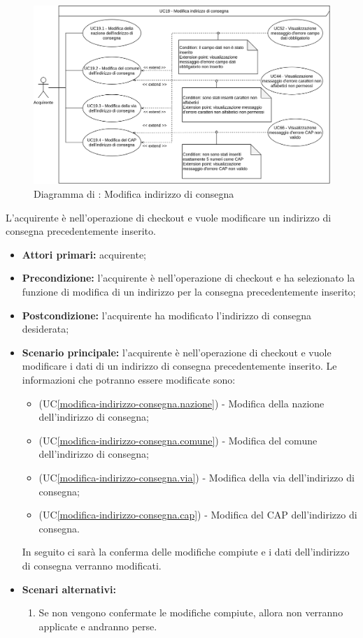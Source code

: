 \begin{figure}[H]
    \centering
    \includegraphics[scale=0.6]{Immagini/DiagrammiUC/ModificaIndirizzoConsegna.png}
    \caption{Diagramma di \actualUC: Modifica indirizzo di consegna} 
    \label{fig:ModificaIndirizzoConsegna}
\end{figure}

L'acquirente è nell'operazione di checkout e vuole modificare un indirizzo di consegna precedentemente inserito.
\begin{itemize}
    \item \textbf{Attori primari:} acquirente;
    \item \textbf{Precondizione:} l'acquirente è nell'operazione di checkout e ha selezionato la funzione di modifica di un indirizzo per la consegna precedentemente inserito;
    \item \textbf{Postcondizione:} l'acquirente ha modificato l'indirizzo di consegna desiderata;
    \item \textbf{Scenario principale:} l'acquirente è nell'operazione di checkout e vuole modificare i dati di un indirizzo di consegna precedentemente inserito. Le informazioni che potranno essere modificate sono:
    \begin{itemize}
        \item (UC\ref{modifica-indirizzo-consegna.nazione}) - Modifica della nazione dell'indirizzo di consegna;
		\item (UC\ref{modifica-indirizzo-consegna.comune}) - Modifica del comune dell'indirizzo di consegna;
		\item (UC\ref{modifica-indirizzo-consegna.via}) - Modifica della via dell'indirizzo di consegna;
		\item (UC\ref{modifica-indirizzo-consegna.cap}) - Modifica del CAP dell'indirizzo di consegna.
    \end{itemize}
    In seguito ci sarà la conferma delle modifiche compiute e i dati dell'indirizzo di consegna verranno modificati.
    \item \textbf{Scenari alternativi:}
    \begin{enumerate}[label=\lett]
        \item Se non vengono confermate le modifiche compiute, allora non verranno applicate e andranno perse.
    \end{enumerate}
\end{itemize}

